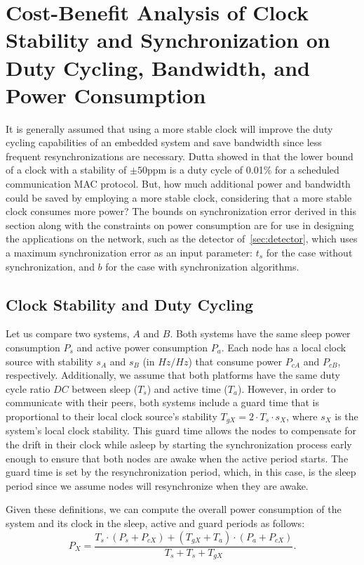 \section{Cost-Benefit Analysis of Clock Stability and Synchronization 
on Duty Cycling, Bandwidth, and Power Consumption}
\label{sec:power}

It is generally assumed that using a more stable clock will improve the duty
cycling capabilities of an embedded system and save bandwidth since less 
frequent resynchronizations are necessary. Dutta
showed in \cite{dutta2007procrastination} that the lower bound of a clock with
a stability of $\pm 50$ppm is a duty cycle of 0.01\% for a scheduled
communication MAC protocol. But, how much additional power and bandwidth could be saved by
employing a more stable clock, considering that a more stable clock consumes
more power? The bounds on synchronization error derived in this section along 
with the constraints on power consumption are for use in designing the applications 
on the network, such as the detector of~\ref{sec:detector}, which uses a maximum 
synchronization error as an input parameter: $t_s$ for the case without 
synchronization, and $b$ for the case with synchronization algorithms.


\subsection{Clock Stability and Duty Cycling}
Let us compare two systems, $A$ and $B$. Both systems have the same sleep power
consumption $P_s$ and active power consumption $P_a$.  Each node has a local
clock source with stability $s_A$ and $s_B$ (in $Hz/Hz$) that consume power $P_{cA}$ and $P_{cB}$,
respectively. Additionally, we assume that both platforms have the same duty
cycle ratio $DC$ between sleep ($T_s$) and active time ($T_a$). However, in order
to communicate with their peers, both systems include a guard time that is
proportional to their local clock source's stability $T_{gX} = 2 \cdot T_s \cdot
s_X$, where $s_X$ is the system's local clock stability. This guard time
allows the nodes to compensate for the drift in their clock while asleep by starting 
the synchronization process early enough to ensure that both nodes are awake when 
the active period starts. The guard time is set by the resynchronization period, which,
 in this case, is the sleep period since we assume nodes will resynchronize when 
they are awake.

Given these definitions, we can compute the overall power consumption of the
system and its clock in the sleep, active and guard periods as follows:
\begin{equation}
	P_X = \frac{T_s \cdot (P_s + P_{cX}) + (T_{gX} + T_a) \cdot (P_a + P_{cX})}{T_s + T_s + T_{gX}}.
\end{equation}

